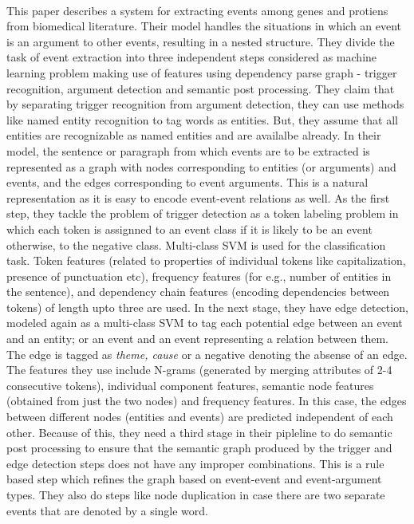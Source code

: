 \\
This paper describes a system for extracting events among genes and protiens from biomedical literature. Their model handles the situations in which an event is an argument to other events, resulting in a nested structure. They divide the task of event extraction into three independent steps considered as machine learning problem making use of features using dependency parse graph - trigger recognition, argument detection and semantic post processing. They claim that by separating trigger recognition from argument detection, they can use methods like named entity recognition to tag words as entities. But, they assume that all entities are recognizable as named entities and are availalbe already. In their model, the sentence or paragraph from which events are to be extracted is represented as a graph with nodes corresponding to entities (or arguments) and events, and the edges corresponding to event arguments. This is a natural representation as it is easy to encode event-event relations as well. As the first step, they tackle the problem of trigger detection as a token labeling problem in which each token is assignned to an event class if it is likely to be an event otherwise, to the negative class. Multi-class SVM is used for the classification task. Token features (related to properties of individual tokens like capitalization, presence of punctuation etc), frequency features (for e.g., number of entities in the sentence), and dependency chain features (encoding dependencies between tokens) of length upto three are used. In the next stage, they have edge detection, modeled again as a multi-class SVM to tag each potential edge between an event and an entity; or an event and an event representing a relation between them. The edge is tagged as {\em theme, cause} or a negative denoting the absense of an edge. The features they use include N-grams (generated by merging attributes of 2-4 consecutive tokens), individual component features, semantic node features (obtained from just the two nodes) and frequency features. In this case, the edges between different nodes (entities and events) are predicted independent of each other. Because of this, they need a third stage in their pipleline to do semantic post processing to ensure that the semantic graph produced by the trigger and edge detection steps does not have any improper combinations. This is a rule based step which refines the graph based on event-event and event-argument types. They also do steps like node duplication in case there are two separate events that are denoted by a single word.

